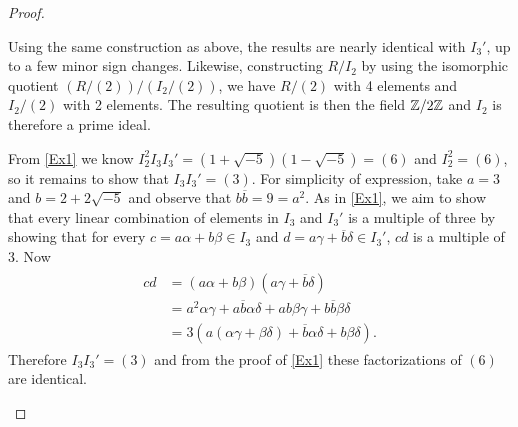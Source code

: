 \documentclass[10pt]{amsart}
\begin{document}
\begin{thm}
\begin{proof}
\begin{alphaenum}
      Using the same construction as above, the results are nearly identical with $I_3'$, up to a few minor sign changes.
      Likewise, constructing $R/I_2$ by using the isomorphic quotient $(R/(2))/(I_2/(2))$, we have $R/(2)$ with 4 elements and $I_2/(2)$ with 2 elements.
      The resulting quotient is then the field $\mathbb{Z}/2\mathbb{Z}$ and $I_2$ is therefore a prime ideal.
      \item
        From \ref{Ex1} we know $I_2^2I_3I_3' = (1+\sqrt{-5})(1-\sqrt{-5}) = (6)$ and $I_2^2 = (6)$, so it remains to show that $I_3I_3' = (3).$
        For simplicity of expression, take  $a = 3$ and $b = 2 + 2\sqrt{-5}$ and observe that $b\overline{b} = 9 = a^2$.
        As in \ref{Ex1}, we aim to show that every linear combination of elements in $I_3$ and $I_3'$ is a multiple of three by showing that for every $c = a\alpha + b\beta \in I_3$ and $d = a\gamma + \overline{b}\delta \in I_3'$, $cd$ is a multiple of 3.
        Now 
        \begin{align*}
          \begin{split}
            cd &= (a\alpha + b\beta)(a\gamma + \overline{b}\delta)\\
            &= a^2\alpha\gamma + a\overline{b}\alpha\delta + ab\beta\gamma + b\overline{b}\beta\delta\\
            &= 3(a(\alpha\gamma  + \beta\delta) + \overline{b}\alpha\delta + b\beta\delta).
          \end{split}
        \end{align*}
        Therefore $I_3I_3' = (3)$ and from the proof of \ref{Ex1} these factorizations of $(6)$ are identical.
    \end{alphaenum}
  \end{proof}
\end{thm}
\end{document}
